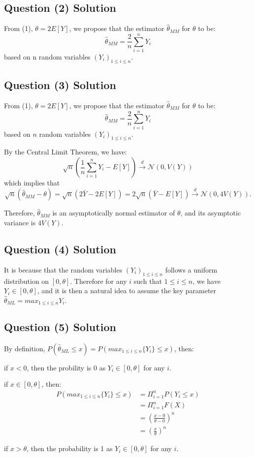 \documentclass{article}
\begin{document}
\subsection{Question (2) Solution}
From (1), $\theta = 2E[Y]$, we propose that the estimator $\hat{\theta}_{MM}$ for $\theta$ to be:
$$\hat{\theta}_{MM} = \frac{2}{n} \sum^{n}_{i=1}Y_i$$
based on n random variables $(Y_i)_{1\leq i \leq n}$.

\subsection{Question (3) Solution}
From (1), $\theta = 2E[Y]$, we propose that the estimator $\hat{\theta}_{MM}$ for $\theta$ to be:
\[
\hat{\theta}_{MM} = \frac{2}{n} \sum^{n}_{i=1}Y_i
\]
based on $n$ random variables $(Y_i)_{1\leq i \leq n}$.

By the Central Limit Theorem, we have:
\[
\sqrt{n}\left(\frac{1}{n}\sum^{n}_{i=1}Y_i - E[Y]\right) \xrightarrow{d} \mathcal{N}(0, V(Y))
\]
which implies that
\[
\sqrt{n}(\hat{\theta}_{MM} - \theta) = \sqrt{n} \left( 2\bar{Y} - 2E[Y] \right) = 2\sqrt{n}(\bar{Y} - E[Y]) \xrightarrow{d} \mathcal{N}(0, 4V(Y)).
\]

Therefore, $\hat{\theta}_{MM}$ is an asymptotically normal estimator of $\theta$, and its asymptotic variance is $4V(Y)$.

\subsection{Question (4) Solution}
It is because that the random variables $(Y_i)_{1\leq i \leq n}$ follows a uniform distribution on $[0, \theta]$.
Therefore for any $i$ such that $1 \leq i \leq n$, we have $Y_i \in [0, \theta]$, and it is then a natural idea to assume the key parameter $\hat{\theta}_{ML} = max_{1\leq i \leq n} {Y_i}$.

\subsection{Question (5) Solution}
By definition, $P(\hat{\theta}_{ML} \leq x) = P(max_{1\leq i \leq n} \{Y_i\} \leq x)$, then:

if $x < 0$, then the probility is 0 as $Y_i \in [0, \theta] $ for any $i$.

if $x \in [0, \theta]$, then:
\begin{align*}
P(max_{1\leq i \leq n} \{Y_i\} \leq x) &= \Pi^{n}_{i=1} P(Y_i\leq x)
\\&= \Pi^n_{i=1} F(X)
\\&= (\frac{x-0}{\theta - 0})^n
\\&= (\frac{x}{\theta})^n
\end{align*}

if $x > \theta$, then the probability is 1 as $Y_i \in [0, \theta] $ for any $i$.
\end{document}
